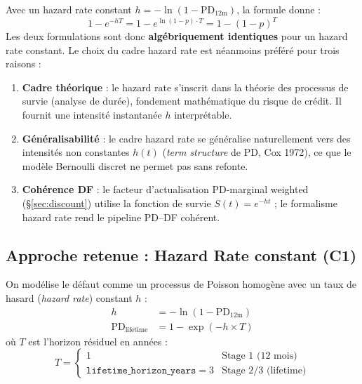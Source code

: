 \documentclass[12pt,a4paper]{article}
\begin{document}
\begin{warningbox}
Avec un hazard rate constant $h = -\ln(1 - \text{PD}_{12\text{m}})$, la formule donne :
\[
1 - e^{-hT} = 1 - e^{\ln(1-p) \cdot T} = 1 - (1-p)^T
\]
Les deux formulations sont donc \textbf{alg\'ebriquement identiques} pour un hazard rate constant. Le choix du cadre hazard rate est n\'eanmoins pr\'ef\'er\'e pour trois raisons :
\begin{enumerate}
    \item \textbf{Cadre th\'eorique} : le hazard rate s'inscrit dans la th\'eorie des processus de survie (analyse de dur\'ee), fondement math\'ematique du risque de cr\'edit. Il fournit une intensit\'e instantan\'ee $h$ interpr\'etable.
    \item \textbf{G\'en\'eralisabilit\'e} : le cadre hazard rate se g\'en\'eralise naturellement vers des intensit\'es non constantes $h(t)$ (\textit{term structure} de PD, Cox 1972), ce que le mod\`ele Bernoulli discret ne permet pas sans refonte.
    \item \textbf{Coh\'erence DF} : le facteur d'actualisation PD-marginal weighted (\S\ref{sec:discount}) utilise la fonction de survie $S(t) = e^{-ht}$ ; le formalisme hazard rate rend le pipeline PD--DF coh\'erent.
\end{enumerate}
\end{warningbox}

\subsection{Approche retenue : Hazard Rate constant (C1)}

\begin{formulebox}
On mod\'elise le d\'efaut comme un processus de Poisson homog\`ene avec un taux de hasard (\textit{hazard rate}) constant $h$ :
\begin{align}
h &= -\ln(1 - \text{PD}_{12\text{m}}) \label{eq:hazard} \\[6pt]
\text{PD}_{\text{lifetime}} &= 1 - \exp(-h \times T) \label{eq:pd_lifetime}
\end{align}
o\`u $T$ est l'horizon r\'esiduel en ann\'ees :
\[
T = \begin{cases}
1 & \text{Stage 1 (12 mois)} \\
\texttt{lifetime\_horizon\_years} = 3 & \text{Stage 2/3 (lifetime)}
\end{cases}
\]
\end{formulebox}
\end{document}
